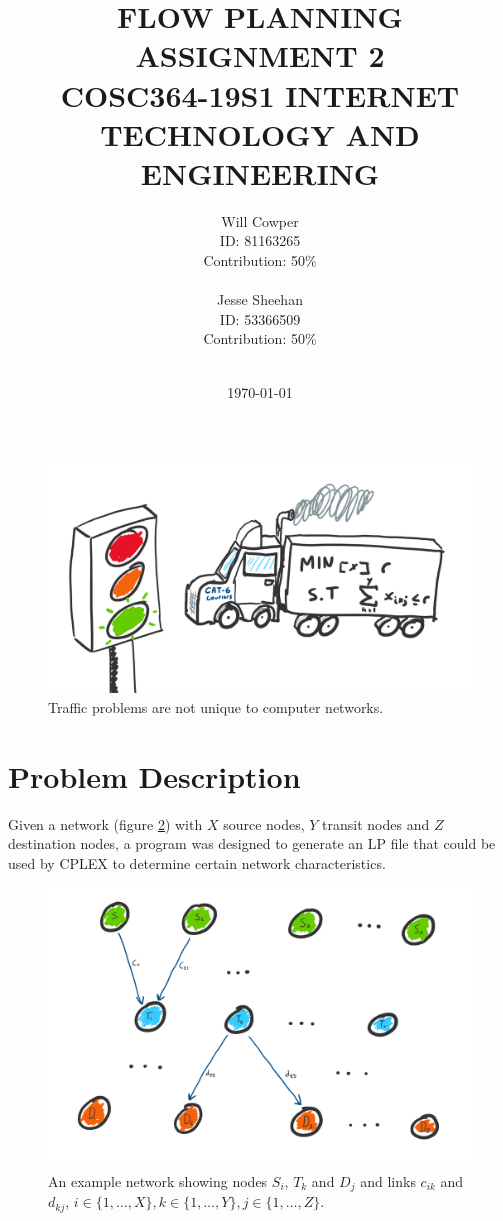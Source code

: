 \documentclass[12pt]{article} %
\title{\uppercase{
	Flow Planning\\
	\large{Assignment 2} \\
	\small{COSC364-19S1 Internet Technology and Engineering}
}}
\date{\today}
\author{
	Will Cowper\\
	{\small{ID: 81163265}}\\
	{\small{Contribution: 50\%}}\\
	\\
	Jesse Sheehan\\
	{\small{ID: 53366509}}\\
	{\small{Contribution: 50\%}}\\
	\\
}
\begin{document}
\maketitle

\begin{figure}[H]
	\centering
	\includegraphics[width=\textwidth]{traffic}
	\caption{Traffic problems are not unique to computer networks.}
	\label{fig:traffic}
\end{figure}



\section{Problem Description}

Given a network (figure \ref{fig:network}) with $X$ source nodes, $Y$ transit nodes and $Z$ destination nodes, a program was designed to generate an LP file that could be used by CPLEX to determine certain network characteristics.

\begin{figure}[H]
	\centering
	\includegraphics[width=\textwidth]{network}
	\caption{An example network showing nodes $S_i$, $T_k$ and $D_j$ and links $c_{ik}$ and $d_{kj}$, $i \in \{1, \ldots, X\}, k \in \{1, \ldots, Y\}, j \in \{1, \ldots, Z\}$.}
	\label{fig:network}
\end{figure}
\end{document}
